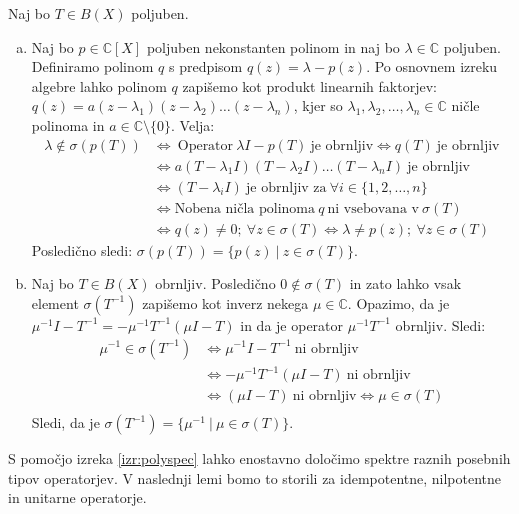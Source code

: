 \documentclass[mat2]{matdelo}
\newcommand{\C}{\mathbb{C}}
\begin{document}
		\begin{dokaz}
			Naj bo $T\in B(X)$ poljuben.
			\begin{enumerate}[a)]
				\item Naj bo $p\in\C[X]$ poljuben nekonstanten polinom in naj bo $\lambda\in\C$ poljuben. Definiramo polinom $q$ s predpisom $q(z) = \lambda - p(z)$. Po osnovnem izreku algebre lahko polinom $q$ zapišemo kot produkt linearnih faktorjev: $q(z) = a(z-\lambda_1)(z-\lambda_2)\ldots(z-\lambda_n)$, kjer so $\lambda_1, \lambda_2,\ldots, \lambda_n\in\C$ ničle polinoma in $a\in\C\setminus\{0\}$. Velja: \begin{align*}
					\lambda\notin \sigma(p(T)) &\iff~\text{Operator}~\lambda I - p(T)~\text{je obrnljiv} \iff q(T)~\text{je obrnljiv} \\
					&\iff a(T-\lambda_1 I)(T-\lambda_2 I)\ldots(T-\lambda_n I)~\text{je obrnljiv} \\
					&\iff (T-\lambda_i I)~\text{je obrnljiv za}~\forall i\in \{1, 2, \ldots, n\}\\
					&\iff \text{Nobena ničla polinoma}~q~\text{ni vsebovana v}~\sigma(T) \\
					&\iff q(z)\neq 0;~\forall z\in\sigma(T) \iff \lambda \neq p(z);~\forall z\in\sigma(T)
				\end{align*}
				Posledično sledi: $\sigma(p(T))=\{p(z)~|~z\in\sigma(T)\}$.
				\item Naj bo $T\in B(X)$ obrnljiv. Posledično $0\notin\sigma(T)$ in zato lahko vsak element $\sigma(T^{-1})$ zapišemo kot inverz nekega $\mu\in\C$. Opazimo, da je $\mu^{-1}I - T^{-1} = -\mu^{-1}T^{-1}(\mu I - T)$ in da je operator $\mu^{-1}T^{-1}$ obrnljiv. Sledi: \begin{align*}
					\mu^{-1}\in\sigma(T^{-1}) &\iff \mu^{-1}I - T^{-1}~\text{ni obrnljiv} \\
					&\iff -\mu^{-1}T^{-1}(\mu I - T)~\text{ni obrnljiv} \\
					&\iff (\mu I - T)~\text{ni obrnljiv} \iff \mu\in\sigma(T) \\
				\end{align*}
				Sledi, da je $\sigma(T^{-1})=\{\mu^{-1}~|~\mu\in\sigma(T)\}$.
			\end{enumerate}
		\end{dokaz}
		
		S pomočjo izreka \ref{izr:polyspec} lahko enostavno določimo spektre raznih posebnih tipov operatorjev. V naslednji lemi bomo to storili za idempotentne, nilpotentne in unitarne operatorje.
		
\end{document}
